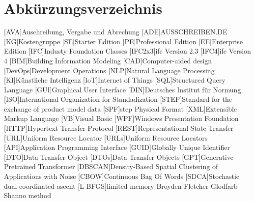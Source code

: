 \chapter{Abkürzungsverzeichnis}
\begin{acronym}
[AVA]{Auschreibung, Vergabe und Abrechung}
[ADE]{AUSSCHREIBEN.DE}
[KG]{Kostengruppe}
[SE]{Starter Edition}
[PE]{Professional Edition}
[EE]{Enterprise Edition}
[IFC]{Industy Foundation Classes}
[IFC2x3]{\ac{ifc} Version 2.3}
[IFC4]{\ac{ifc} Version 4}
[BIM]{Building Information Modeling}
[CAD]{Computer-aided design}
[DevOps]{Development Operations}
[NLP]{Natural Language Processing}
[KI]{Künstliche Intelligenz}
[IoT]{Internet of Things}
[SQL]{Structured Query Language}
[GUI]{Graphical User Interface}
[DIN]{Deutsches Institut für Normung}
[ISO]{International Organization for Standadization}
[STEP]{Standard for the exchange of product model data}
[SPF]{\ac{step} Physical Format}
[XML]{Extensible Markup Language}
[VB]{Visual Basic}
[WPF]{Windows Presentation Foundation}
[HTTP]{Hypertext Transfer Protocol}
[REST]{Representational State Transfer}
[URL]{Uniform Resource Locator}
[URLs]{Uniform Resource Locators}
[API]{Application Programming Interface}
[GUID]{Globally Unique Identifier}
[DTO]{Data Transfer Object}
[DTOs]{Data Transfer Objects}
[GPT]{Generative Pretrained Transformer}
[DBSCAN]{Density-Based Spatial Clustering of Applications with Noise}
[CBOW]{Continuous Bag Of Words}
[SDCA]{Stochastic dual coordinated ascent}
[L-BFGS]{limited memory Broyden-Fletcher-Glodfarb-Shanno method}
\end{acronym}